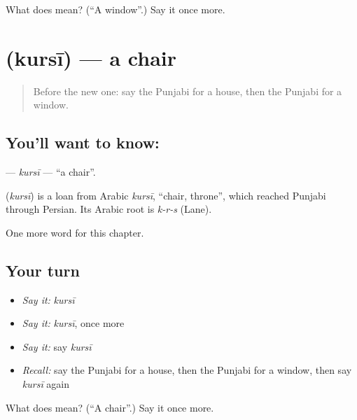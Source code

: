 \begin{tcolorbox}[breakable,colback=teal!4,colframe=teal!35!black,title={Before you move on}]
What does  mean? (\textquotedblleft{}A window\textquotedblright{}.) Say it once more.
\end{tcolorbox}
\section[\texorpdfstring{\pa{ਕੁਰਸੀ} (kursī)}{ਕੁਰਸੀ (kursī)}]{ (kursī) — a chair}

\label{lesson:PA-C67-kursi}



\begin{quote}
Before the new one: say the Punjabi for a house, then the Punjabi for a window.
\end{quote}

\subsection*{You'll want to know: }
\textbf{} — \emph{kursī} — \textquotedblleft{}a chair\textquotedblright{}.

\begin{cousinweb}
\textbf{} (\emph{kursī}) is a loan from Arabic \emph{kursī}, \textquotedblleft{}chair, throne\textquotedblright{}, which reached Punjabi through Persian. Its Arabic root is \emph{k-r-s} (Lane).
\end{cousinweb}

\begin{grammarlens}[title={What you've built}]
One more word for this chapter.
\end{grammarlens}

\subsection*{Your turn}
\begin{itemize}
\raggedright
  \item \emph{Say it:} \emph{kursī}
  \item \emph{Say it:} \emph{kursī}, once more
  \item \emph{Say it:} say \emph{kursī}
  \item \emph{Recall:} say the Punjabi for a house, then the Punjabi for a window, then say \emph{kursī} again
\end{itemize}

\begin{tcolorbox}[breakable,colback=teal!4,colframe=teal!35!black,title={Before you move on}]
What does  mean? (\textquotedblleft{}A chair\textquotedblright{}.) Say it once more.
\end{tcolorbox}
